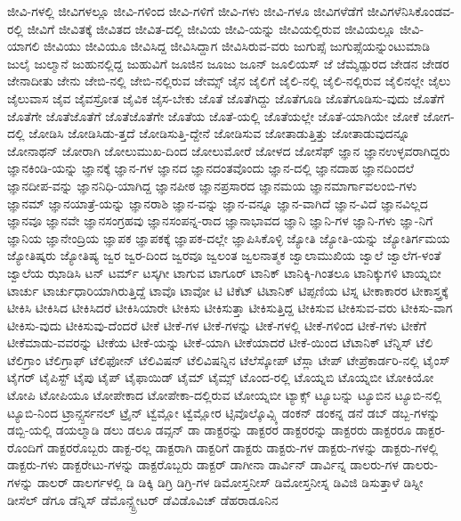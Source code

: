 {ಜೀವಿ-ಗಳಲ್ಲಿ
ಜೀವಿಗಳಲ್ಲೂ
ಜೀವಿ-ಗಳಿಂದ
ಜೀವಿ-ಗಳಿಗೆ
ಜೀವಿ-ಗಳು
ಜೀವಿ-ಗಳೂ
ಜೀವಿಗಳೆಡೆಗೆ
ಜೀವಿಗಳೆನಿಸಿಕೊಂಡವ-ರಲ್ಲಿ
ಜೀವಿಗೆ
ಜೀವಿತಕ್ಕೆ
ಜೀವಿತದ
ಜೀವಿತ-ದಲ್ಲಿ
ಜೀವಿಯ
ಜೀವಿ-ಯನ್ನು
ಜೀವಿಯಲ್ಲಿರುವ
ಜೀವಿಯಲ್ಲೂ
ಜೀವಿ-ಯಾಗಲಿ
ಜೀವಿಯು
ಜೀವಿಯೂ
ಜೀವಿಸಿದ್ದ
ಜೀವಿಸಿದ್ದಾಗ
ಜೀವಿಸಿರುವ-ವರು
ಜುಗುಪ್ಸೆ
ಜುಗುಪ್ಸೆಯನ್ನುಂಟುಮಾಡಿ
ಜುಲೈ
ಜುಲ್ಮಾನೆ
ಜುಹುನಲ್ಲಿದ್ದ
ಜುಹುವಿಗೆ
ಜೂಜಿನ
ಜೂಜು
ಜೂನ್
ಜೂಲಿಯಸ್
ಜೆ
ಜೆಮ್ಶೆಡ್ಪುರದ
ಜೇಡನ
ಜೇಡರ
ಜೇನಾದೀತು
ಜೇನು
ಜೇಬಿ-ನಲ್ಲಿ
ಜೇಬಿ-ನಲ್ಲಿರುವ
ಜೇಮ್ಸ್
ಜೈನ
ಜೈಲಿಗೆ
ಜೈಲಿ-ನಲ್ಲಿ
ಜೈಲಿ-ನಲ್ಲಿರುವ
ಜೈಲಿನಲ್ಲೇ
ಜೈಲು
ಜೈಲುವಾಸ
ಜೈವ
ಜೈವಸ್ರೋತ
ಜೈವಿಕ
ಜೈಸ-ಬೇಕು
ಜೊತೆ
ಜೊತೆಗಿದ್ದು
ಜೊತೆಗೂಡಿ
ಜೊತೆಗೂಡಿಸು-ವುದು
ಜೊತೆಗೆ
ಜೊತೆಗೇ
ಜೊತೆಜೊತೆಗೆ
ಜೊತೆಜೊತೆಗೇ
ಜೊತೆಯ
ಜೊತೆ-ಯಲ್ಲಿ
ಜೊತೆಯಲ್ಲೇ
ಜೊತೆ-ಯಾಗಿಯೇ
ಜೋಕೆ
ಜೋಗ-ದಲ್ಲಿ
ಜೋಡಿಸಿ
ಜೋಡಿಸಿಡು-ತ್ತದೆ
ಜೋಡಿಸುತ್ತಿ-ದ್ದೇನೆ
ಜೋಡಿಸುವ
ಜೋತಾಡುತ್ತಿತ್ತು
ಜೋತಾಡುವುದನ್ನೂ
ಜೋನಾಥನ್
ಜೋರಾಗಿ
ಜೋಲುಮುಖ-ದಿಂದ
ಜೋಲುಮೋರೆ
ಜೋಳದ
ಜೋಸೆಫ್
ಜ್ಞಾನ
ಜ್ಞಾನಉಳ್ಳವರಾಗಿದ್ದರು
ಜ್ಞಾನಕಿಂಡಿ-ಯನ್ನು
ಜ್ಞಾನಕ್ಕೆ
ಜ್ಞಾನ-ಗಳ
ಜ್ಞಾನದ
ಜ್ಞಾನದಂತವೊಂದು
ಜ್ಞಾನ-ದಲ್ಲಿ
ಜ್ಞಾನದಾಹ
ಜ್ಞಾನದಿಂದಲೆ
ಜ್ಞಾನದೀಪ-ವನ್ನು
ಜ್ಞಾನನಿಧಿ-ಯಾಗಿದ್ದ
ಜ್ಞಾನಪೀಠ
ಜ್ಞಾನಪ್ರಸಾರದ
ಜ್ಞಾನಮಯ
ಜ್ಞಾನಮಾರ್ಗಾವಲಂಬಿ-ಗಳು
ಜ್ಞಾನಮ್
ಜ್ಞಾನಯಾತ್ರೆ-ಯನ್ನು
ಜ್ಞಾನರಾಶಿ
ಜ್ಞಾನ-ವನ್ನು
ಜ್ಞಾನ-ವನ್ನೂ
ಜ್ಞಾನ-ವಾಗಿದೆ
ಜ್ಞಾನ-ವಿದೆ
ಜ್ಞಾನವಿಲ್ಲದ
ಜ್ಞಾನವೂ
ಜ್ಞಾನವೇ
ಜ್ಞಾನಸಂಗ್ರಹವು
ಜ್ಞಾನಸಂಪನ್ನ-ರಾದ
ಜ್ಞಾನಾಭಾವದ
ಜ್ಞಾನಿ
ಜ್ಞಾನಿ-ಗಳ
ಜ್ಞಾನಿ-ಗಳು
ಜ್ಞಾ-ನಿಗೆ
ಜ್ಞಾನಿಯ
ಜ್ಞಾನೇಂದ್ರಿಯ
ಜ್ಞಾಪಕ
ಜ್ಞಾಪಕಕ್ಕೆ
ಜ್ಞಾಪಕ-ದಲ್ಲೇ
ಜ್ಞಾಪಿಸಿಕೊಳ್ಳಿ
ಜ್ಯೋತಿ
ಜ್ಯೋತಿ-ಯನ್ನು
ಜ್ಯೋತಿರ್ಗಮಯ
ಜ್ಯೋತಿಷ್ಕರು
ಜ್ಯೋತಿಷ್ಯ
ಜ್ವರ
ಜ್ವರ-ದಿಂದ
ಜ್ವರವೂ
ಜ್ವಲಂತ
ಜ್ವಲನಾತ್ಮಕ
ಜ್ವಾಲಾಮುಖಿಯ
ಜ್ವಾಲೆ
ಜ್ವಾಲೆಗ-ಳಂತೆ
ಜ್ವಾಲೆಯ
ಝಾಡಿಸಿ
ಟನ್
ಟರ್ಮ್
ಟಸ್ಕಗೀ
ಟಾಗುವ
ಟಾಗೂರ್
ಟಾನಿಕ್
ಟಾನಿಕ್ಕಿ-ಗಿಂತಲೂ
ಟಾನಿಕ್ಕುಗಳಿ
ಟಾಯ್ನಬೀ
ಟಾರ್ಚು
ಟಾರ್ಚುಧಾರಿಯಾಗಿರುತ್ತಿದ್ದೆ
ಟಾವೊ
ಟಾವೋ
ಟಿ
ಟಿಕೆಟ್
ಟಿಟಾನಿಕ್
ಟಿಪ್ಪಣಿಯ
ಟಿಸ್ನ
ಟೀಕಾಕಾರರ
ಟೀಕಾಸ್ತ್ರಕ್ಕೆ
ಟೀಕಿಸಿ
ಟೀಕಿಸಿದ
ಟೀಕಿಸಿದರೆ
ಟೀಕಿಸಿಯಾರೇ
ಟೀಕಿಸು
ಟೀಕಿಸುತ್ತಾ
ಟೀಕಿಸುತ್ತಿದ್ದ
ಟೀಕಿಸುವ
ಟೀಕಿಸುವ-ವರು
ಟೀಕಿಸು-ವಾಗ
ಟೀಕಿಸು-ವುದು
ಟೀಕಿಸುವು-ದೆಂದರೆ
ಟೀಕೆ
ಟೀಕೆ-ಗಳ
ಟೀಕೆ-ಗಳನ್ನು
ಟೀಕೆ-ಗಳಲ್ಲಿ
ಟೀಕೆ-ಗಳಿಂದ
ಟೀಕೆ-ಗಳು
ಟೀಕೆಗೆ
ಟೀಕೆಮಾಡು-ವವರನ್ನು
ಟೀಕೆಯ
ಟೀಕೆ-ಯನ್ನು
ಟೀಕೆ-ಯಾಗಿ
ಟೀಕೆಯಾದರೆ
ಟೀಕೆ-ಯಿಂದ
ಟೆಟಾನಿಕ್
ಟೆನ್ನಿಸ್
ಟೆಲಿ
ಟೆಲಿಗ್ರಾಂ
ಟೆಲಿಗ್ರಾಫ್
ಟೆಲಿಫೋನ್
ಟೆಲಿವಿಷನ್
ಟೆಲಿವಿಷನ್ನಿನ
ಟೆಲೆಸ್ಕೋಪ್
ಟೆಸ್ಲಾ
ಟೇಪ್
ಟೇಪ್ರೆಕಾರ್ಡರಿ-ನಲ್ಲಿ
ಟೈಂಸ್
ಟೈಗರ್
ಟೈಪಿಸ್ಟ್
ಟೈಪು
ಟೈಪ್
ಟೈಫಾಯಿಡ್
ಟೈಮ್
ಟೈಮ್ಸ್
ಟೊಂದ-ರಲ್ಲಿ
ಟೊಯ್ನಬಿ
ಟೊಯ್ನಬೀ
ಟೋಕಿಯೋ
ಟೋಪಿ
ಟೋಪಿಯೂ
ಟೋಪೇಕಾದ
ಟೋಪೇಕಾ-ದಲ್ಲಿರುವ
ಟೋಯ್ನಬೀ
ಟ್ಯಾಕ್ಸ್
ಟ್ಯೂಬನ್ನು
ಟ್ಯೂಬಿನ
ಟ್ಯೂಬಿ-ನಲ್ಲಿ
ಟ್ಯೂಬಿ-ನಿಂದ
ಟ್ರಾನ್ಸ್ಪರ್ಸನಲ್
ಟ್ರೈನ್
ಟ್ವೆಮ್ಲೋ
ಟ್ವೆಮ್ಲೋರ
ಟ್ಸಿವೊಲ್ಕೊವ್ಸ್ಕಿ
ಡಂಕನ್
ಡಂಕನ್ನ
ಡನೆ
ಡಬ್
ಡಬ್ಬ-ಗಳನ್ನು
ಡಬ್ಬಿ-ಯಲ್ಲಿ
ಡಯಲ್ಮಾಡಿ
ಡಲು
ಡಲೂ
ಡವ್ಸನ್
ಡಾ
ಡಾಕ್ಟರನ್ನು
ಡಾಕ್ಟರರ
ಡಾಕ್ಟರರನ್ನು
ಡಾಕ್ಟರರು
ಡಾಕ್ಟರರೂ
ಡಾಕ್ಟರ-ರೊಂದಿಗೆ
ಡಾಕ್ಟರರೊಬ್ಬರು
ಡಾಕ್ಟ-ರಲ್ಲ
ಡಾಕ್ಟರಾಗಿ
ಡಾಕ್ಟರಿಗೆ
ಡಾಕ್ಟರು
ಡಾಕ್ಟರು-ಗಳ
ಡಾಕ್ಟರು-ಗಳನ್ನು
ಡಾಕ್ಟರು-ಗಳಲ್ಲಿ
ಡಾಕ್ಟರು-ಗಳು
ಡಾಕ್ಟರೇಟು-ಗಳನ್ನು
ಡಾಕ್ಟರೊಬ್ಬರು
ಡಾಕ್ಟರ್
ಡಾಗೀನಾ
ಡಾರ್ವಿನ್
ಡಾರ್ವಿನ್ನ
ಡಾಲರು-ಗಳ
ಡಾಲರು-ಗಳನ್ನು
ಡಾಲರ್
ಡಾಲರ್ಗಳಲ್ಲಿ
ಡಿ
ಡಿಕ್ಕಿ
ಡಿಗ್ರಿ
ಡಿಗ್ರಿ-ಗಳ
ಡಿಮೋಸ್ತನೀಸ್
ಡಿಮೋಸ್ತನೀಸ್ನ
ಡಿವಿಜಿ
ಡಿಸುತ್ತಾಳೆ
ಡಿಸ್ನೀ
ಡೀಸೆಲ್
ಡೆಗೂ
ಡೆನ್ನಿಸ್
ಡೆಮೊನ್ಸ್ಟ್ರೇಟರ್
ಡೆವಿಡೊವಿಚ್
ಡೆಹರಾಡೂನಿನ
}
